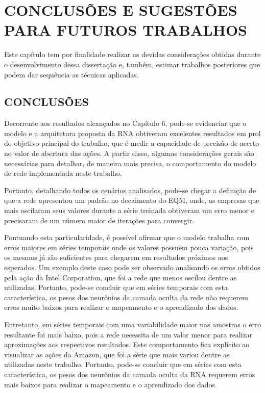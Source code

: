 
\chapter{CONCLUSÕES E SUGESTÕES PARA FUTUROS TRABALHOS}\label{ch:conclusao}
Este capítulo tem por finalidade realizar as devidas considerações obtidas durante o desenvolvimento dessa dissertação e, também, estimar trabalhos posteriores que podem dar sequência as técnicas aplicadas.
\section{CONCLUSÕES}

Decorrente aos resultados alcançados no Capítulo 6, pode-se evidenciar que o modelo e a arquitetura proposta da RNA obtiveram excelentes resultados em prol do objetivo principal do trabalho, que é medir a capacidade de precisão de acerto no valor de abertura das ações. A partir disso, algumas considerações gerais são necessárias para detalhar, de maneira mais precisa, o comportamento do modelo de rede implementada neste trabalho.

Portanto, detalhando todos os cenários analisados, pode-se chegar a definição de que a rede apresentou um padrão no decaimento do EQM, onde, as empresas que mais oscilaram seus valores durante a série treinada obtiveram um erro menor e precisaram de um número maior de iterações para convergir. 

Pontuando esta particularidade, é possível afirmar que o modelo trabalha com erros maiores em séries temporais onde os valores possuem pouca variação, pois os mesmos já são suficientes para chegarem em resultados próximos aos esperados. Um exemplo deste caso pode ser observado analisando os erros obtidos pela ação da Intel Corporation, que foi a rede que menos oscilou dentre as utilizadas. Portanto, pode-se concluir que em séries temporais com esta característica, os pesos dos neurônios da camada oculta da rede não requerem erros muito baixos para realizar o mapeamento e o aprendizado dos dados. 

Entretanto, em séries temporais com uma variabilidade maior nas amostras o erro resultante foi mais baixo, pois a rede necessita de um valor menor para realizar aproximações aos respectivos resultados. Este comportamento fica explícito ao visualizar as ações da Amazon, que foi a série que mais variou dentre as utilizadas neste trabalho. Portanto, pode-se concluir que em séries com esta característica, os pesos dos neurônios da camada oculta da RNA requerem erros mais baixos para realizar o mapeamento e o aprendizado dos dados.
  
